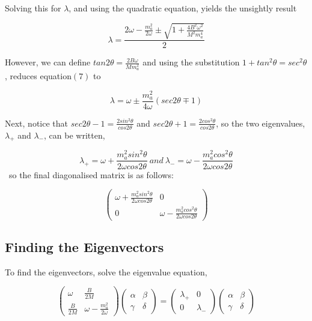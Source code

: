 \documentclass[12pt]{article}
\begin{document}
Solving this for $\lambda$, and using the quadratic equation, yields the unsightly result 

\begin{equation}
\lambda = \frac{2\omega - \frac{m_a^2}{2\omega}\pm \sqrt{1+\frac{4B^2\omega^2}{M^2m_a^4}}}{2}
\end{equation}

However, we can define $tan2\theta = \frac{2B\omega}{Mm_a^2}$ and using the substitution $1+tan^2\theta = sec^2\theta$, reduces equation$(7)$ to 

\begin{equation}
\lambda = \omega \pm \frac{m_a^2}{4\omega} (sec2\theta \mp 1)
\end{equation}

Next, notice that $sec2\theta-1 = \frac{2sin^2\theta}{cos2\theta}$ and $sec2\theta+1 = \frac{2cos^2\theta}{cos2\theta}$, so the two eigenvalues, $\lambda_+$ and $\lambda_-$, can be written, 

\begin{equation}
\lambda_+ = \omega + \frac{m_a^2sin^2\theta}{2\omega cos2\theta} \ and \  
\lambda_- = \omega - \frac{m_a^2cos^2\theta}{2\omega cos2\theta}
\end{equation}
\
so the final diagonalised matrix is as follows: 

\begin{equation*}
\left( \begin{array}{ccc} 
\omega + \frac{m_a^2sin^2\theta}{2\omega cos2\theta} & 0 \\
0 & \omega - \frac{m_a^2cos^2\theta}{2\omega cos2\theta} \end{array} \right)
\end{equation*}

\subsection{Finding the Eigenvectors}

To find the eigenvectors, solve the eigenvalue equation, 

\begin{equation}
\left ( \begin{array}{ccc} 
\omega & \frac{B}{2M} \\
\frac{B}{2M} & \omega-\frac{m_a^2}{2\omega} \end{array} \right)
\left( \begin{array}{ccc}
\alpha & \beta \\
\gamma & \delta \end{array} \right) 
=\left ( \begin{array}{ccc} 
\lambda_+ & 0 \\
0 & \lambda_- \end{array} \right)
\left( \begin{array}{ccc}
\alpha & \beta \\
\gamma & \delta \end{array} \right)
\end{equation}
\end{document}
